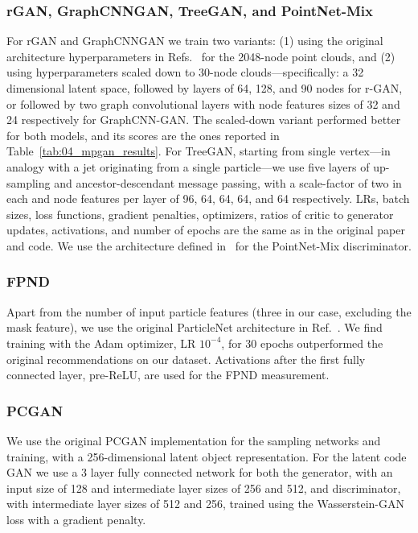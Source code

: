 \subsubsection{rGAN, GraphCNNGAN, TreeGAN, and PointNet-Mix}

For rGAN and GraphCNNGAN we train two variants: (1) using the original architecture hyperparameters in Refs.~\cite{rgan, graphcnngan} for the 2048-node point clouds, and (2) using hyperparameters scaled down to 30-node clouds---specifically: a 32 dimensional latent space, followed by layers of 64, 128, and 90 nodes for r-GAN, or followed by two graph convolutional layers with node features sizes of 32 and 24 respectively for GraphCNN-GAN.
The scaled-down variant performed better for both models, and its scores are the ones reported in Table~\ref{tab:04_mpgan_results}.
For TreeGAN, starting from single vertex---in analogy with a jet originating from a single particle---we use five layers of up-sampling and ancestor-descendant message passing, with a scale-factor of two in each and node features per layer of 96, 64, 64, 64, and 64 respectively.  
LRs, batch sizes, loss functions, gradient penalties, optimizers, ratios of critic to generator updates, activations, and number of epochs are the same as in the original paper and code. 
We use the architecture defined in~\cite{wang2020rethinking} for the PointNet-Mix discriminator. 

\subsubsection{FPND}
\label{app:04_mpgan_pnet}

Apart from the number of input particle features (three in our case, excluding the mask feature), we use the original ParticleNet architecture in Ref.~\cite{Qu:2019gqs}. 
We find training with the Adam optimizer, LR $10^{-4}$, for 30 epochs outperformed the original recommendations on our dataset. 
Activations after the first fully connected layer, pre-ReLU, are used for the FPND measurement.

\subsubsection{PCGAN}
\label{app:04_mpgan_pcgan}

We use the original PCGAN implementation for the sampling networks and training, with a 256-dimensional latent object representation.
For the latent code GAN we use a 3 layer fully connected network for both the generator, with an input size of 128 and intermediate layer sizes of 256 and 512, and discriminator, with intermediate layer sizes of 512 and 256, trained using the Wasserstein-GAN~\cite{WGAN} loss with a gradient penalty.


